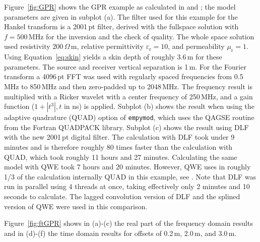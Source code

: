 \documentclass[paper,twocolumn,twoside]{geophysics}
\newcommand{\mr}[1]{\mathrm{#1}}
\begin{document}
Figure~\ref{fig:GPR} shows the GPR example as calculated in
\cite{GEO.15.Hunziker} and \cite{GEO.17.Werthmuller}; the model parameters are
given in subplot (a). The filter used for this example for the Hankel transform
is a 2001\,pt filter, derived with the fullspace solution with $f=500\,$MHz for
the inversion and the check of quality. The whole space solution used
resistivity $200\,\Omega\,$m, relative permittivity $\varepsilon_\mr{r}=10$,
and permeability $\mu_\mr{r}=1$. Using Equation~\ref{eq:skin} yields a skin
depth of roughly 3.6\,m for these parameters. The source and receiver vertical
separation is 1\,m. For the Fourier transform a 4096\,pt FFT was used with
regularly spaced frequencies from 0.5\,MHz to 850\,MHz and then zero-padded up
to 2048\,MHz. The frequency result is multiplied with a Ricker wavelet with a
center frequency of 250\,MHz, and a gain function ($1 + |t^3|, t$ in ns) is
applied. Subplot (b) shows the result when using the adaptive quadrature (QUAD)
option of \texttt{empymod}, which uses the QAGSE routine from the Fortran
QUADPACK library. Subplot (c) shows the result using DLF with the new 2001\,pt
digital filter. The calculation with DLF took under 9 minutes and is therefore
roughly 80 times faster than the calculation with QUAD, which took roughly 11
hours and 27 minutes. Calculating the same model with QWE took 7 hours and 20
minutes. However, QWE uses in roughly 1/3 of the calculation internally QUAD in
this example, see \cite{GEO.17.Werthmuller}. Note that DLF was run in parallel
using 4 threads at once, taking effectively only 2 minutes and 10 seconds to
calculate.
The lagged convolution version of DLF and the splined version of QWE were used
in this comparison.
%
%

Figure~\ref{fig:ftGPR} shows in (a)-(c) the real 
part of the frequency domain results and in (d)-(f) the time domain
results for offsets of 0.2\,m, 2.0\,m, and 3.0\,m.
%
%
\end{document}
